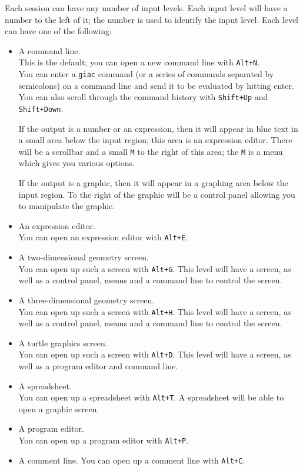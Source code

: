 \documentclass[a4paper,11pt]{book}
\begin{document}
Each session can have any number of input levels.  Each input level
will have a number to the left of it; the number is used to identify
the input level.  Each level can have one of the following:
\begin{itemize}
  \item A command line.\\
  This is the default; you can open a new
  command line with \texttt{Alt+N}.\\
  You can enter a \texttt{giac} command (or a series of commands
  separated by semicolons) on a command line and send it to be
  evaluated by hitting enter.  You can also scroll through the command
  history with \texttt{Shift+Up} and \texttt{Shift+Down}.
  
  If the output is a number or an expression, then it will appear in
  blue text in a small area below the input region; this area is an
  expression editor.  There will be a scrollbar and a small \texttt{M}
  to the right of this area; the \texttt{M} is a menu which gives you
  various options.

  If the output is a graphic, then it will appear in a graphing area
  below the input region.  To the right of the graphic will be a
  control panel allowing you to manipulate the graphic.

  \item  An expression editor.\\  
  You can open an expression editor with
  \texttt{Alt+E}.
  
  \item A two-dimensional geometry screen.\\
  You can open up such a
  screen with \texttt{Alt+G}.
  This level will have a screen, as well as a control panel, menus and a
  command line to control the screen.
  
  \item A three-dimensional geometry screen.\\
  You can open up such a
  screen with \texttt{Alt+H}.
  This level will have a screen, as well as a control panel, menus and
  a command line to control the screen.
  
  \item A turtle graphics screen.\\
  You can open up such a screen with
  \texttt{Alt+D}.
  This level will have a screen, as well as a program editor and
  command line.
  
  \item A spreadsheet.\\
  You can open up a spreadsheet with \texttt{Alt+T}.
  A spreadsheet will be able to open a graphic screen.
  
  \item A program editor.\\
  You can open up a program editor with
  \texttt{Alt+P}.
  
  \item A comment line.  You can open up a comment line with
  \texttt{Alt+C}.
\end{itemize}
\end{document}
